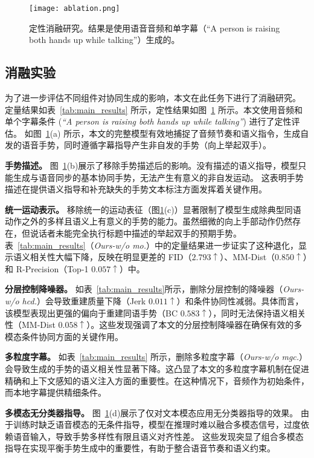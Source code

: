 \begin{figure}[t]
    \centering
    \texttt{[image: ablation.png]}
    \caption{定性消融研究。结果是使用语音音频和单字幕（“A person is raising both hands up while talking”）生成的。}
    \label{fig:ablation}
\end{figure}

\subsection{消融实验}
\label{sec:exp_ablation}
为了进一步评估不同组件对协同生成的影响，本文在此任务下进行了消融研究。
定量结果如表~\ref{tab:main_results} 所示，定性结果如图~\ref{fig:ablation} 所示。本文使用音频和单个字幕条件 (\textit{``A person is raising both hands up while talking''}) 进行了定性评估。
如图~\ref{fig:ablation}(a) 所示，本文的完整模型有效地捕捉了音频节奏和语义指令，生成自发的语音手势，同时遵循字幕指导产生非自发的手势（向上举起双手）。

\textbf{手势描述。}
图~\ref{fig:ablation}(b)展示了移除手势描述后的影响。没有描述的语义指导，模型只能生成与语音同步的基本协同手势，无法产生有意义的非自发运动。
这表明手势描述在提供语义指导和补充缺失的手势文本标注方面发挥着关键作用。

\textbf{统一运动表示。}
移除统一的运动表征（图\ref{fig:ablation}(c)）显著限制了模型生成除典型同语动作之外的多样且语义上有意义的手势的能力。虽然细微的向上手部动作仍然存在，但说话者未能完全执行标题中描述的举起双手的预期手势。
表~\ref{tab:main_results}（\textit{Ours-w/o mo.}）中的定量结果进一步证实了这种退化，显示语义相关性大幅下降，反映在明显更差的 FID（$2.793\uparrow$）、MM-Dist（$0.850\uparrow$）和 R-Precision（Top-1 $0.057\uparrow$）中。

\textbf{分层控制降噪器。} %
如表~\ref{tab:main_results}所示，删除分层控制的降噪器（\textit{Ours-w/o hcd.}）会导致重建质量下降（Jerk $0.011\uparrow$）和条件协同性减弱。具体而言，该模型表现出更强的偏向于重建同语手势（BC $0.583\uparrow$），同时无法保持语义相关性（MM-Dist $0.058\uparrow$）。这些发现强调了本文的分层控制降噪器在确保有效的多模态条件协同方面的关键作用。

\textbf{多粒度字幕。}
如表~\ref{tab:main_results} 所示，删除多粒度字幕（\textit{Ours-w/o mgc.}）会导致生成的手势的语义相关性显著下降。这凸显了本文的多粒度字幕机制在促进精确和上下文感知的语义注入方面的重要性。在这种情况下，音频作为初始条件，而本地字幕提供精细条件。

\textbf{多模态无分类器指导。}
图~\ref{fig:ablation}(d)展示了仅对文本模态应用无分类器指导的效果。
由于训练时缺乏语音模态的无条件指导，模型在推理时难以融合多模态信号，过度依赖语音输入，导致手势多样性有限且语义对齐性差。
这些发现突显了组合多模态指导在实现平衡手势生成中的重要性，有助于整合语音节奏和语义约束。

